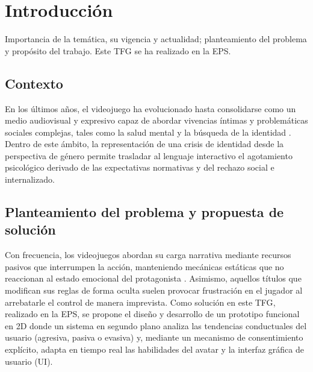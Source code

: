 \chapter{Introducción}
\label{cap:introduccion}

Importancia de la temática, su vigencia y actualidad; planteamiento del problema
y propósito del trabajo. Este \ac{TFG} se ha realizado en la \ac{EPS}.

\section{Contexto}
En los últimos años, el videojuego ha evolucionado hasta consolidarse como un medio audiovisual y expresivo capaz de abordar vivencias íntimas y problemáticas sociales complejas, tales como la salud mental y la búsqueda de la identidad \parencite{bogost2011, navarro2023}. Dentro de este ámbito, la representación de una crisis de identidad desde la perspectiva de género permite trasladar al lenguaje interactivo el agotamiento psicológico derivado de las expectativas normativas y del rechazo social e internalizado.

\section{Planteamiento del problema y propuesta de solución}
Con frecuencia, los videojuegos abordan su carga narrativa mediante recursos pasivos que interrumpen la acción, manteniendo mecánicas estáticas que no reaccionan al estado emocional del protagonista \parencite{finestrat2018}. Asimismo, aquellos títulos que modifican sus reglas de forma oculta suelen provocar frustración en el jugador al arrebatarle el control de manera imprevista.
Como solución en este \ac{TFG}, realizado en la \ac{EPS}, se propone el diseño y desarrollo de un prototipo funcional en \ac{2D} donde un sistema en segundo plano analiza las tendencias conductuales del usuario (agresiva, pasiva o evasiva) y, mediante un mecanismo de consentimiento explícito, adapta en tiempo real las habilidades del avatar y la interfaz gráfica de usuario (\ac{UI}).

